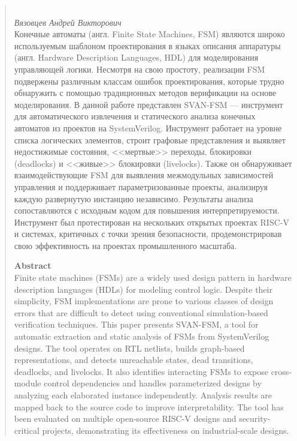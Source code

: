 \begin{abstract}

    \begin{center}
        \large{} \\
    \large\textit{Вязовцев Андрей Викторович} \\[1 cm]

Конечные автоматы (англ. Finite State Machines, FSM) являются широко используемым шаблоном проектирования
в языках описания аппаратуры (англ. Hardware Description Languages, HDL) для моделирования управляющей
логики. Несмотря на свою простоту, реализации FSM подвержены различным классам ошибок проектирования,
которые трудно обнаружить с помощью традиционных методов верификации на основе моделирования. В данной
работе представлен SVAN-FSM --- инструмент для автоматического извлечения и статического анализа конечных
автоматов из проектов на SystemVerilog. Инструмент работает на уровне списка логических элементов, строит
графовые представления и выявляет недостижимые состояния, <<мертвые>> переходы, блокировки (deadlocks)
и <<живые>> блокировки (livelocks). Также он обнаруживает взаимодействующие FSM для выявления межмодульных
зависимостей управления и поддерживает параметризованные проекты, анализируя каждую развернутую инстанцию
независимо. Результаты анализа сопоставляются с исходным кодом для повышения интерпретируемости.
Инструмент был протестирован на нескольких открытых проектах RISC-V и системах, критичных с точки
зрения безопасности, продемонстрировав свою эффективность на проектах промышленного масштаба.

    \vfill

    \textbf{Abstract} \\[1 cm]

Finite state machines (FSMs) are a widely used design pattern in hardware description languages (HDLs)
for modeling control logic. Despite their simplicity, FSM implementations are prone to various classes
of design errors that are difficult to detect using conventional simulation-based verification techniques.
This paper presents SVAN-FSM, a tool for automatic extraction and static analysis of FSMs from
SystemVerilog designs. The tool operates on RTL netlists, builds graph-based representations, and detects
unreachable states, dead transitions, deadlocks, and livelocks. It also identifies interacting FSMs
to expose cross-module control dependencies and handles parameterized designs by analyzing each elaborated
instance independently. Analysis results are mapped back to the source code to improve interpretability.
The tool has been evaluated on multiple open-source RISC-V designs and security-critical projects,
demonstrating its effectiveness on industrial-scale designs.

    \end{center}

\end{abstract}
